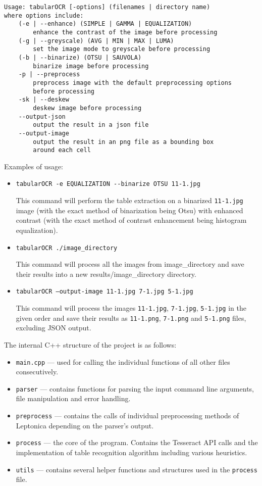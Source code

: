 \begin{verbatim}
Usage: tabularOCR [-options] (filenames | directory name)
where options include:
    (-e | --enhance) (SIMPLE | GAMMA | EQUALIZATION)
        enhance the contrast of the image before processing
    (-g | --greyscale) (AVG | MIN | MAX | LUMA)
        set the image mode to greyscale before processing
    (-b | --binarize) (OTSU | SAUVOLA)
        binarize image before processing
    -p | --preprocess
        preprocess image with the default preprocessing options
        before processing
    -sk | --deskew
        deskew image before processing
    --output-json
        output the result in a json file
    --output-image
        output the result in an png file as a bounding box
        around each cell
\end{verbatim}
Examples of usage: 
\begin{itemize}
    \item \texttt{tabularOCR -e EQUALIZATION -{}-binarize OTSU 11-1.jpg}
    
    This command will perform the table extraction on a binarized \texttt{11-1.jpg} image (with the exact method of binarization being Otsu) with enhanced contrast (with the exact method of contrast enhancement being histogram equalization).
    
    \item \texttt{tabularOCR ./image\_directory}
    
    This command will process all the images from image\_directory and save their results into a new results/image\_directory directory.
    
    \item \texttt{tabularOCR --output-image 11-1.jpg 7-1.jpg 5-1.jpg}
    
    This command will process the images \texttt{11-1.jpg}, \texttt{7-1.jpg}, \texttt{5-1.jpg} in the given order and save their results as \texttt{11-1.png}, \texttt{7-1.png} and \texttt{5-1.png} files, excluding JSON output.
    
\end{itemize}
    
The internal C++ structure of the project is as follows:
\begin{itemize}
    \item \texttt{main.cpp} --- used for calling the individual functions of all other files consecutively.
    \item \texttt{parser} --- contains functions for parsing the input command line arguments, file manipulation and error handling.
    \item \texttt{preprocess} --- contains the calls of individual preprocessing methods of Leptonica depending on the parser's output.
    \item \texttt{process} --- the core of the program. Contains the Tesseract API calls and the implementation of table recognition algorithm including various heuristics.
    \item \texttt{utils} --- contains several helper functions and structures used in the \texttt{process} file.
\end{itemize}